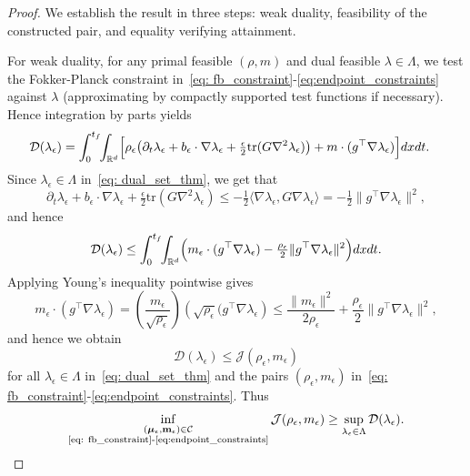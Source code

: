\documentclass[10pt,a4paper]{amsart}
\newcommand{\R}{\mathbb{R}}
\begin{document}
\begin{proof}
We establish the result in three steps: weak duality, feasibility of the constructed pair, and equality verifying attainment.

For weak duality, for any primal feasible $(\rho,m)$ and dual feasible $\lambda\in\Lambda$, we test the Fokker-Planck constraint in~\eqref{eq: fb_constraint}-\eqref{eq:endpoint_constraints} against $\lambda$ (approximating by compactly supported test functions if necessary). Hence integration by parts yields
\begin{align*}
\mathcal D(\lambda_{\epsilon})
&=\int_0^{t_f}\!\!\int_{\R^d}
\Bigl[\rho_{\epsilon}\bigl(\partial_t\lambda_{\epsilon}+b_\epsilon\cdot\nabla\lambda_{\epsilon}
+\tfrac{\epsilon}{2}\mathrm{tr}(G\nabla^2\lambda_{\epsilon})\bigr)
+ m\cdot(g^\top\nabla\lambda_{\epsilon})\Bigr] dx dt.
\end{align*}
Since $\lambda_{\epsilon}\in\Lambda$ in~\eqref{eq: dual_set_thm}, we get that
\[
\partial_t\lambda_{\epsilon}+b_\epsilon\cdot\nabla\lambda_{\epsilon}
+\tfrac{\epsilon}{2}\mathrm{tr}(G\nabla^2\lambda_{\epsilon})
\le -\tfrac12\langle\nabla\lambda_{\epsilon},G\nabla\lambda_{\epsilon}\rangle
=-\tfrac12\|g^\top\nabla\lambda_{\epsilon}\|^2,
\]
and hence
\[
\mathcal D(\lambda_{\epsilon})\le \int_0^{t_f}\!\!\int_{\R^d}
\Bigl(m_{\epsilon}\cdot(g^\top\nabla\lambda_{\epsilon})-\tfrac{\rho_{\epsilon}}{2}\|g^\top\nabla\lambda_{\epsilon}\|^2\Bigr) dx dt.
\]
Applying Young's inequality pointwise gives
\begin{equation}\label{eq: Young's inequality}
m_{\epsilon}\cdot(g^\top\nabla\lambda_{\epsilon})=\left(\frac{m_{\epsilon}}{\sqrt{\rho_{\epsilon}}}\right)\left(\sqrt{\rho_{\epsilon}}(g^\top\nabla\lambda_{\epsilon}\right)
\le \frac{\|m_{\epsilon}\|^2}{2\rho_{\epsilon}}+\frac{\rho_{\epsilon}}{2}\|g^\top\nabla\lambda_{\epsilon}\|^2,
\end{equation}
and hence we obtain 
\[
\mathcal D(\lambda_{\epsilon})\le \mathcal J(\rho_{\epsilon},m_{\epsilon})
\]
for all $\lambda_{\epsilon}\in\Lambda$ in~\eqref{eq: dual_set_thm} and the pairs $(\rho_{\epsilon},m_{\epsilon})$ in~\eqref{eq: fb_constraint}-\eqref{eq:endpoint_constraints}. Thus 
\begin{equation}\label{eq: weak duality} 
\inf_{\substack{(\boldsymbol\mu_{\epsilon}, \mathbf m_{\epsilon})\in \mathcal C \\ \text{\eqref{eq: fb_constraint}-\eqref{eq:endpoint_constraints}}}} 
\mathcal{J}(\rho_{\epsilon},m_{\epsilon}) \geq \sup_{\lambda_{\epsilon}\in\Lambda}\mathcal D(\lambda_{\epsilon}).

\end{equation}
\end{proof}
\end{document}
